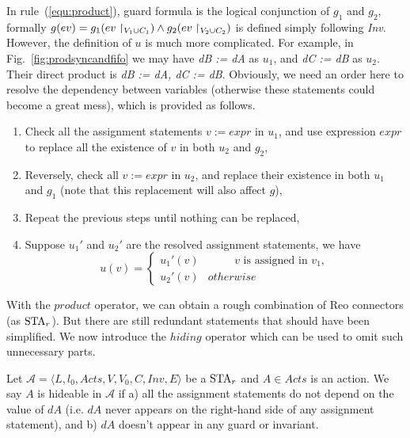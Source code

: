 In rule~(\ref{equ:product}), guard formula is the logical conjunction of $g_1$ and $g_2$, formally $g(ev)=g_1(ev\restriction_{V_1\cup C_1})\land g_2(ev\restriction_{V_2\cup C_2})$ is defined simply following \emph{Inv}. However, the definition of $u$ is much more complicated. For example, in Fig.~\ref{fig:prodsyncandfifo} we may have \emph{dB := dA} as $u_1$, and \emph{dC := dB} as $u_2$. Their direct product is \emph{dB := dA, dC := dB}. Obviously, we need an order here to resolve the dependency between variables (otherwise these statements could become a great mess), which is provided as follows.

\begin{enumerate}
    \item Check all the assignment statements $v:=expr$ in $u_1$, and use expression $expr$ to replace all the existence of $v$ in both $u_2$ and $g_2$,
    \item Reversely, check all $v:=expr$ in $u_2$, and replace their existence in both $u_1$ and $g_1$ (note that this replacement will also affect $g$),
    \item Repeat the previous steps until nothing can be replaced,
    \item Suppose $u_1'$ and $u_2'$ are the resolved assignment statements, we have
        \begin{displaymath}
            u(v)=\left\{
            \begin{array}{lr}
                u_1'(v) & \hspace{1cm}\mbox{$v$ is assigned in $v_1$}, \\
                u_2'(v) & otherwise
            \end{array}
            \right.
        \end{displaymath}
\end{enumerate}


With the $product$ operator, we can obtain a rough combination of Reo connectors (as $\mbox{STA}_r$). But there are still redundant statements that should have been simplified. We now introduce the $hiding$ operator which can be used to omit such unnecessary parts.

\begin{definition}
    Let $\mathscr{A}= \langle L, l_0, Acts, V, V_0, C, Inv, E\rangle$ be a $\mbox{STA}_r$ and $A\in Acts$ is an action. We say $A$ is hideable in $\mathscr{A}$ if a) all the assignment statements do not depend on the value of $dA$ (i.e. $dA$ never appears on the right-hand side of any assignment statement), and b) $dA$ doesn't appear in any guard or invariant.
\end{definition}


